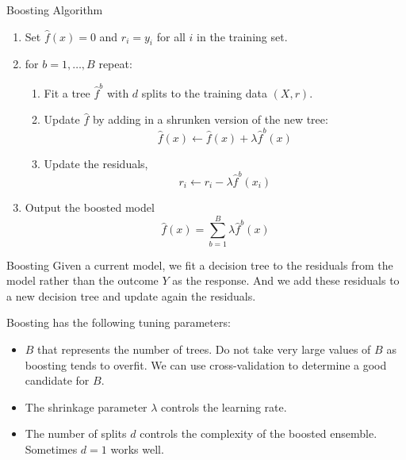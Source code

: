 \documentclass{beamer}
\begin{document}
	\begin{frame}{Boosting Algorithm}
		\begin{enumerate}
			\item Set $\hat{f}(x)=0$ and $r_i=y_i$ for all $i$ in the training set. 
			\item for $b=1,\ldots, B$ repeat:
			\begin{enumerate}
				\item Fit a tree $\hat{f}^b$ with $d$ splits to the training data $(X,r)$.
				\item Update $\hat{f}$ by adding in a shrunken version of the new tree:
				\begin{equation*}
					\hat{f}(x) \leftarrow \hat{f}(x)+ \lambda \hat{f}^b (x)
				\end{equation*}
				\item Update the residuals,
				\begin{equation*}
					r_i \leftarrow r_i - \lambda \hat{f}^b(x_i)
				\end{equation*}
			\end{enumerate}
			\item Output the boosted model
			\begin{equation}
				\hat{f}(x)=\sum_{b=1}^B \lambda \hat{f}^b(x)
			\end{equation}
		\end{enumerate}
	\end{frame}
	
	\begin{frame}{Boosting}
		Given a current model, we fit a decision tree to the residuals from the model rather than the outcome $Y$ as the response. And we add these residuals to a new decision tree and update again the residuals. 
		
		Boosting has the following tuning parameters:
		
		\begin{itemize}
			\item $B$ that represents the number of trees. Do not take very large values of $B$ as boosting tends to overfit. We can use cross-validation to determine a good candidate for $B$.
			\item The shrinkage parameter $\lambda$ controls the learning rate. 
			\item The number of splits $d$ controls the complexity of the boosted ensemble. Sometimes $d=1$ works well. 
	\end{itemize} \end{frame}
	
\end{document}
